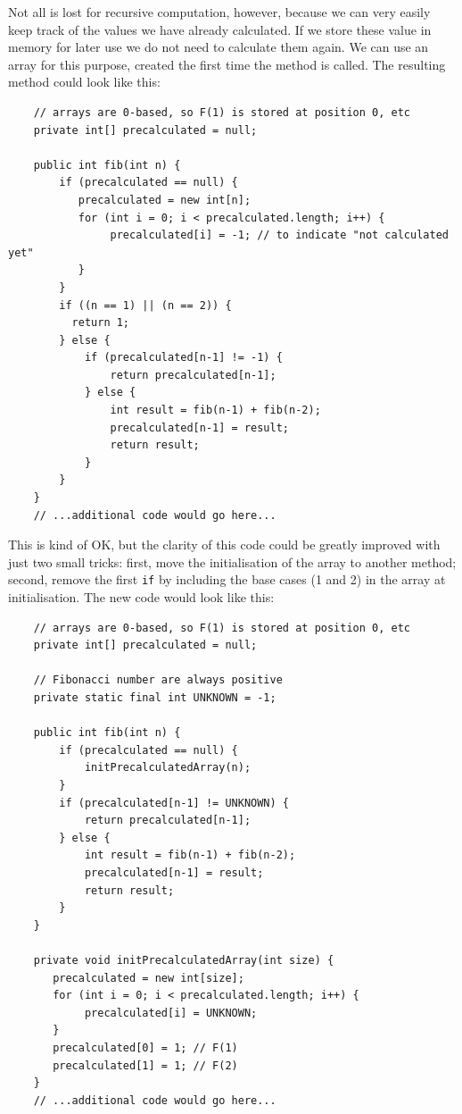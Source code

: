 Not all is lost for recursive computation, however, because we can
very easily keep track of the values we have already calculated. If we
store these value in memory for later use we do not need to calculate
them again. We can use an array for this purpose, created the first
time the method is called. The resulting method could look like this: 

\begin{verbatim}
    // arrays are 0-based, so F(1) is stored at position 0, etc
    private int[] precalculated = null;

    public int fib(int n) {
        if (precalculated == null) {
           precalculated = new int[n];
           for (int i = 0; i < precalculated.length; i++) {
                precalculated[i] = -1; // to indicate "not calculated yet"
           }
        }
        if ((n == 1) || (n == 2)) {
          return 1; 
        } else {
            if (precalculated[n-1] != -1) {
                return precalculated[n-1];
            } else {
                int result = fib(n-1) + fib(n-2);
                precalculated[n-1] = result;
                return result;
            }
        }
    }
    // ...additional code would go here...
\end{verbatim}

This is kind of OK, but the clarity of this code could be greatly
improved with just two small tricks: first, move the initialisation
of the array to another method; second, remove the first \verb+if+ by
including the base cases (1 and 2) in the array at initialisation. The
new code would look like this: 

\begin{verbatim}
    // arrays are 0-based, so F(1) is stored at position 0, etc
    private int[] precalculated = null;

    // Fibonacci number are always positive
    private static final int UNKNOWN = -1;

    public int fib(int n) {
        if (precalculated == null) {
            initPrecalculatedArray(n);
        }
        if (precalculated[n-1] != UNKNOWN) {
            return precalculated[n-1];
        } else {
            int result = fib(n-1) + fib(n-2);
            precalculated[n-1] = result;
            return result;
        }
    }

    private void initPrecalculatedArray(int size) {
       precalculated = new int[size];
       for (int i = 0; i < precalculated.length; i++) {
            precalculated[i] = UNKNOWN;
       }
       precalculated[0] = 1; // F(1)
       precalculated[1] = 1; // F(2)
    }
    // ...additional code would go here...
\end{verbatim}

